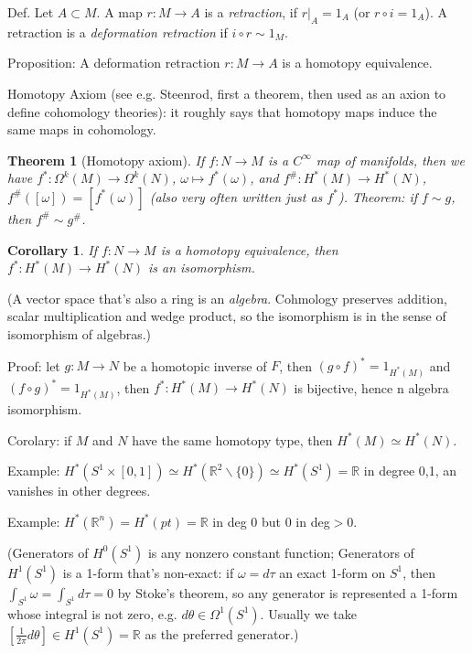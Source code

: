 \documentclass{article}
\theoremstyle{mystyle}
\newtheorem*{theorem*}{Theorem}
\newtheorem*{corollary*}{Corollary}
\theoremstyle{remark}
\numberwithin{equation}{section}
\begin{document}
Def. Let $A\subset M$. A map $r\colon M\rightarrow A$ is a \emph{retraction}, if $r|_A = 1_A$ (or $r\circ i=1_A$). A retraction is a \emph{deformation retraction} if $i\circ r\sim 1_M$.

Proposition: A deformation retraction $r\colon M\rightarrow A$ is a homotopy equivalence.

Homotopy Axiom (see e.g. Steenrod, first a theorem, then used as an axion to define cohomology theories): it roughly says that homotopy maps induce the same maps in cohomology. 

\begin{theorem*}[Homotopy axiom]
If $f\colon N\rightarrow M$ is a $C^\infty$ map of manifolds, then we have $f^*\colon \Omega^k(M)\rightarrow \Omega^k(N)$, $\omega\mapsto f^*(\omega)$, and $f^\#\colon H^*(M)\rightarrow H^*(N)$, $f^\#([\omega])=[f^*(\omega)]$ (also very often written just as $f^*$). Theorem: if $f\sim g$, then $f^\#\sim g^\#$. 
\end{theorem*}


\begin{corollary*} If $f\colon N\rightarrow M$ is a homotopy equivalence, then $f^*\colon H^*(M)\rightarrow H^*(N)$ is an isomorphism.
\end{corollary*}


(A vector space that's also a ring is an \emph{algebra}. Cohmology preserves addition, scalar multiplication and wedge product, so the isomorphism is in the sense of isomorphism of algebras.)

Proof: let $g\colon M\rightarrow N$ be a homotopic inverse of $F$, then $(g\circ f)^*=1_{H^*(M)}$ and $(f\circ g)^* = 1_{H^*(M)}$, then $f^*\colon H^*(M)\rightarrow H^*(N)$ is bijective, hence n algebra isomorphism.

Corolary: if $M$ and $N$ have the same homotopy type, then $H^*(M)\simeq H^*(N)$.

Example: $H^*(S^1\times [0,1]) \simeq H^*(\mathbb{R}^2\backslash\{0\})\simeq H^*(S^1) =\mathbb{R}$ in degree 0,1, an vanishes in other degrees.

Example: $H^*(\mathbb{R}^n) = H^*(pt) = \mathbb{R}$ in deg 0 but 0 in deg$>0$.

(Generators of $H^0(S^1)$ is any nonzero constant function; Generators of $H^1(S^1)$ is a 1-form that's non-exact: if $\omega = d\tau$ an exact 1-form on $S^1$, then $\int_{S^1}\omega = \int_{S^1}d\tau=0$ by Stoke's theorem, so any generator is represented a 1-form whose integral is not zero, e.g. $d\theta \in \Omega^1(S^1)$. Usually we take $[\frac{1}{2\pi}d\theta] \in H^1(S^1)=\mathbb{R}$ as the preferred generator.)
\end{document}
